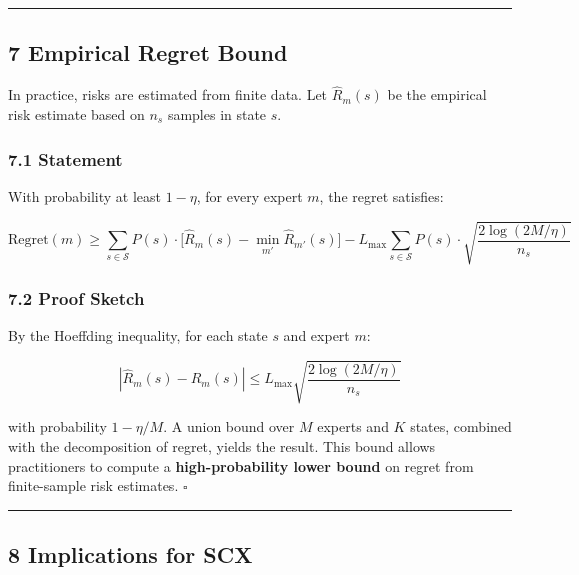 \documentclass[
  12pt,
]{article}
\begin{document}
\begin{center}\rule{0.5\linewidth}{0.5pt}\end{center}

\subsection{7 Empirical Regret Bound}\label{empirical-regret-bound}

In practice, risks are estimated from finite data. Let \(\hat{R}_m(s)\)
be the empirical risk estimate based on \(n_s\) samples in state \(s\).

\subsubsection{7.1 Statement}\label{statement-3}

With probability at least \(1 - \eta\), for every expert \(m\), the
regret satisfies:

\[\text{Regret}(m) \geq \sum_{s \in \mathcal{S}} P(s) \cdot \bigl[\hat{R}_m(s) - \min_{m'} \hat{R}_{m'}(s)\bigr] - L_{\max} \sum_{s \in \mathcal{S}} P(s) \cdot \sqrt{\frac{2\log(2M/\eta)}{n_s}}\]

\subsubsection{7.2 Proof Sketch}\label{proof-sketch}

By the Hoeffding inequality, for each state \(s\) and expert \(m\):

\[|\hat{R}_m(s) - R_m(s)| \leq L_{\max} \sqrt{\frac{2\log(2M/\eta)}{n_s}}\]

with probability \(1 - \eta/M\). A union bound over \(M\) experts and
\(K\) states, combined with the decomposition of regret, yields the
result. This bound allows practitioners to compute a
\textbf{high-probability lower bound} on regret from finite-sample risk
estimates. \(\square\)

\begin{center}\rule{0.5\linewidth}{0.5pt}\end{center}

\subsection{8 Implications for SCX}\label{implications-for-scx}
\end{document}

